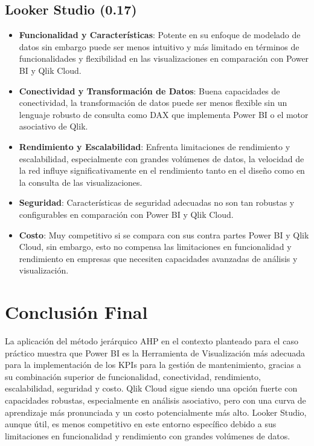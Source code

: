 \documentclass[
  11pt,
  bookmarksnumbered]{article}
\begin{document}
\hypertarget{looker-studio-0.17}{%
\subsection{Looker Studio (0.17)}\label{looker-studio-0.17}}

\begin{itemize}
\item
  \textbf{Funcionalidad y Características}: Potente en su enfoque de modelado de datos sin embargo puede ser menos intuitivo y más limitado en términos de funcionalidades y flexibilidad en las visualizaciones en comparación con Power BI y Qlik Cloud.
\item
  \textbf{Conectividad y Transformación de Datos}: Buena capacidades de conectividad, la transformación de datos puede ser menos flexible sin un lenguaje robusto de consulta como DAX que implementa Power BI o el motor asociativo de Qlik.
\item
  \textbf{Rendimiento y Escalabilidad}: Enfrenta limitaciones de rendimiento y escalabilidad, especialmente con grandes volúmenes de datos, la velocidad de la red influye significativamente en el rendimiento tanto en el diseño como en la consulta de las visualizaciones.
\item
  \textbf{Seguridad}: Características de seguridad adecuadas no son tan robustas y configurables en comparación con Power BI y Qlik Cloud.
\item
  \textbf{Costo}: Muy competitivo si se compara con sus contra partes Power BI y Qlik Cloud, sin embargo, esto no compensa las limitaciones en funcionalidad y rendimiento en empresas que necesiten capacidades avanzadas de análisis y visualización.
\end{itemize}

\hypertarget{conclusiuxf3n-final}{%
\section{Conclusión Final}\label{conclusiuxf3n-final}}

La aplicación del método jerárquico AHP en el contexto planteado para el caso práctico muestra que Power BI es la Herramienta de Visualización más adecuada para la implementación de los KPIs para la gestión de mantenimiento, gracias a su combinación superior de funcionalidad, conectividad, rendimiento, escalabilidad, seguridad y costo. Qlik Cloud sigue siendo una opción fuerte con capacidades robustas, especialmente en análisis asociativo, pero con una curva de aprendizaje más pronunciada y un costo potencialmente más alto. Looker Studio, aunque útil, es menos competitivo en este entorno específico debido a sus limitaciones en funcionalidad y rendimiento con grandes volúmenes de datos.
\end{document}
